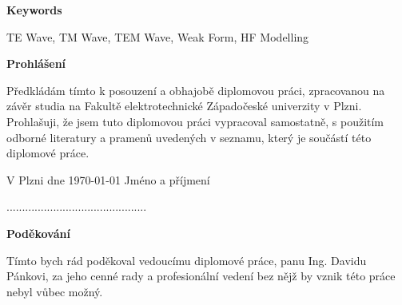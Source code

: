 \documentclass[14pt,a4paper,oneside]{memoir}
\begin{document}
\begin{large}
\textbf{Keywords \vspace{5mm}\\}
\end{large}
TE Wave, TM Wave, TEM Wave, Weak Form, HF Modelling
\newpage
\vspace*{50mm}
\begin{large}
\textbf{Prohlášení \vspace{5mm}\\}
\end{large}
Předkládám tímto k posouzení a obhajobě diplomovou práci, zpracovanou na závěr studia na Fakultě elektrotechnické Západočeské univerzity v Plzni.\vspace{5mm}\\
Prohlašuji, že jsem tuto diplomovou práci vypracoval samostatně, s použitím odborné literatury a pramenů uvedených v seznamu, který je součástí této diplomové práce.
\vspace{\fill}
\begin{flushleft}
V Plzni dne \today
\hspace{\fill}
Jméno a příjmení~~~~~~~~\vspace{3mm}
\end{flushleft}
\begin{flushright}
.............................................
\end{flushright}
\newpage
\vspace*{50mm}
\begin{large}
\textbf{Poděkování \vspace{5mm}\\}
\end{large}
Tímto bych rád poděkoval vedoucímu diplomové práce, panu Ing. Davidu Pánkovi, za jeho cenné rady a profesionální vedení bez nějž by vznik této práce nebyl vůbec možný.
\end{document}
